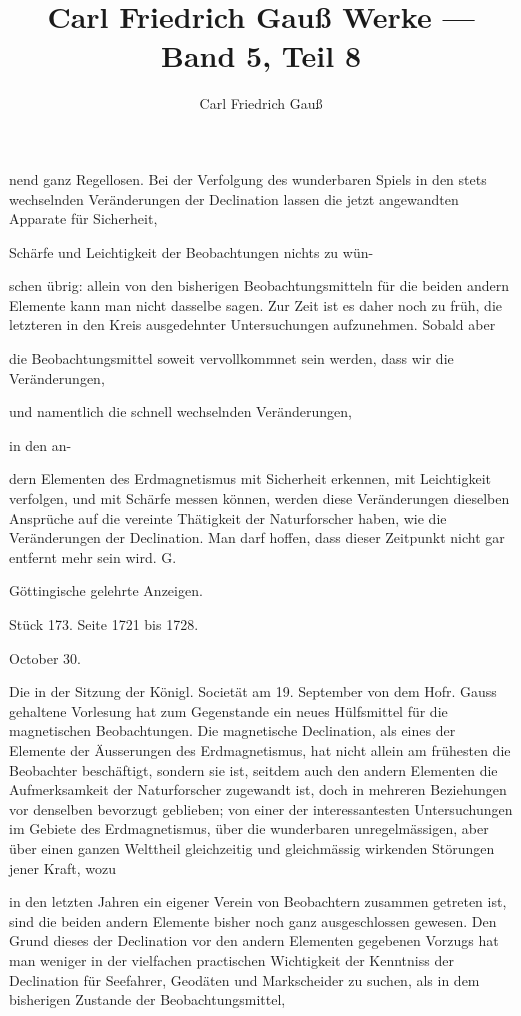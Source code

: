 \documentclass[12pt,a4paper]{article}
\title{Carl Friedrich Gauß Werke --- Band 5, Teil 8}
\author{Carl Friedrich Gauß}
\date{}
\begin{document}
\maketitle
\setcounter{page}{351}

nend ganz Regellosen. Bei der Verfolgung des wunderbaren Spiels in den stets wechselnden Veränderungen der Declination lassen die jetzt angewandten Apparate für Sicherheit,

Schärfe und Leichtigkeit der Beobachtungen nichts zu wün-

schen übrig: allein von den bisherigen Beobachtungsmitteln für die beiden andern Elemente kann man nicht dasselbe sagen. Zur Zeit ist es daher noch zu früh, die letzteren in den Kreis ausgedehnter Untersuchungen aufzunehmen. Sobald aber

die Beobachtungsmittel soweit vervollkommnet sein werden, dass wir die Veränderungen,

und namentlich die schnell wechselnden Veränderungen,

in den an-

dern Elementen des Erdmagnetismus mit Sicherheit erkennen, mit Leichtigkeit verfolgen, und mit Schärfe messen können, werden diese Veränderungen dieselben Ansprüche auf die vereinte Thätigkeit der Naturforscher haben, wie die Veränderungen der Declination. Man darf hoffen, dass dieser Zeitpunkt nicht gar entfernt mehr sein wird. G.

Göttingische gelehrte Anzeigen.

Stück 173. Seite 1721 bis 1728.

October 30.

Die in der Sitzung der Königl. Societät am 19. September von dem Hofr. Gauss gehaltene Vorlesung hat zum Gegenstande ein neues Hülfsmittel für die magnetischen Beobachtungen. Die magnetische Declination, als eines der Elemente der Äusserungen des Erdmagnetismus, hat nicht allein am frühesten die Beobachter beschäftigt, sondern sie ist, seitdem auch den andern Elementen die Aufmerksamkeit der Naturforscher zugewandt ist, doch in mehreren Beziehungen vor denselben bevorzugt geblieben; von einer der interessantesten Untersuchungen im Gebiete des Erdmagnetismus, über die wunderbaren unregelmässigen, aber über einen ganzen Welttheil gleichzeitig und gleichmässig wirkenden Störungen jener Kraft, wozu

in den letzten Jahren ein eigener Verein von Beobachtern zusammen getreten ist, sind die beiden andern Elemente bisher noch ganz ausgeschlossen gewesen. Den Grund dieses der Declination vor den andern Elementen gegebenen Vorzugs hat man weniger in der vielfachen practischen Wichtigkeit der Kenntniss der Declination für Seefahrer, Geodäten und Markscheider zu suchen, als in dem bisherigen Zustande der Beobachtungsmittel,
\end{document}
